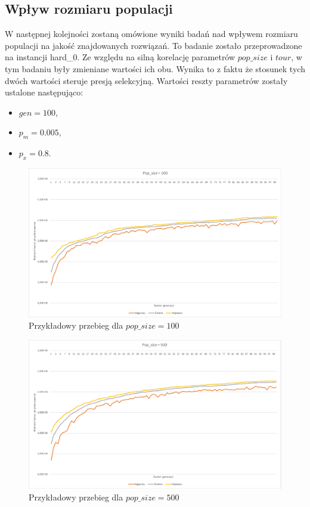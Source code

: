 \documentclass{article}
\begin{document}
	\newpage
	\subsection{Wpływ rozmiaru populacji}
	W następnej kolejności zostaną omówione wyniki badań nad wpływem rozmiaru populacji na jakość znajdowanych rozwiązań. To badanie zostało przeprowadzone na instancji hard\_0. Ze względu na silną korelację parametrów $pop\_size$ i $tour$, w tym badaniu były zmieniane wartości ich obu. Wynika to z faktu że stosunek tych dwóch wartości steruje presją selekcyjną. Wartości reszty parametrów zostały ustalone następująco:
	\begin{itemize}
		\item $gen = 100$,
		\item $p_m = 0.005$,
		\item $p_x = 0.8$.
	\end{itemize}
	
	\begin{figure}[H]
		\centering
		\includegraphics[width=1\linewidth]{popsize100.png}
		\caption{Przykładowy przebieg dla $pop\_size=100$}
		\label{fig:pop100}
	\end{figure}
	
	
	\begin{figure}[H]
		\centering
		\includegraphics[width=1\linewidth]{popsize500.png}
		\caption{Przykładowy przebieg dla $pop\_size=500$}
		\label{fig:pop500}
	\end{figure}
	
\end{document}
